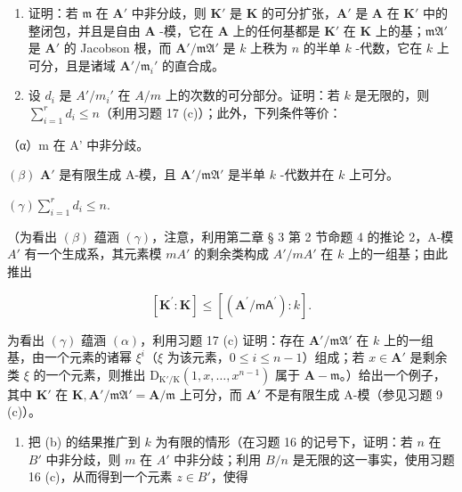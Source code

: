\begin{enumerate}
\def\labelenumi{(\alph{enumi})}
\item
  证明：若 \(\mathfrak{m}\) 在 \(\mathbf{A}'\) 中非分歧，则 \(\mathbf{K}'\) 是 \(\mathbf{K}\) 的可分扩张，\(\mathbf{A}'\) 是 \(\mathbf{A}\) 在 \(\mathbf{K}'\) 中的整闭包，并且是自由 \(\mathbf{A}\) -模，它在 \(\mathbf{A}\) 上的任何基都是 \(\mathbf{K}'\) 在 \(\mathbf{K}\) 上的基；\(\mathfrak{mA}'\) 是 \(\mathbf{A}'\) 的 Jacobson 根，而 \(\mathbf{A}' / \mathfrak{mA}'\) 是 \(k\) 上秩为 \(n\) 的半单 \(k\) -代数，它在 \(k\) 上可分，且是诸域 \(\mathbf{A}' / \mathfrak{m}_i'\) 的直合成。
\item
  设 \(d_{i}\) 是 \(A'/m_{i}'\) 在 \(A/m\) 上的次数的可分部分。证明：若 \(k\) 是无限的，则 \(\sum_{i=1}^{r} d_{i} \leqslant n\)（利用习题 17 (c)）；此外，下列条件等价：
\end{enumerate}

（α）m 在 A' 中非分歧。

\((\beta)\) \(\mathbf{A}'\) 是有限生成 A-模，且 \(\mathbf{A}' / \mathfrak{mA}'\) 是半单 \(k\) -代数并在 \(k\) 上可分。

\((\gamma)\sum_{i=1}^{r}d_{i}\leqslant n.\)

（为看出 \((\beta)\) 蕴涵 \((\gamma)\)，注意，利用第二章 § 3 第 2 节命题 4 的推论 2，A-模 \(A'\) 有一个生成系，其元素模 \(mA'\) 的剩余类构成 \(A'/mA'\) 在 \(k\) 上的一组基；由此推出

\[
[ \mathbf {K} ^ {\prime}: \mathbf {K} ] \leqslant [ (\mathbf {A} ^ {\prime} / \mathsf {m A} ^ {\prime}): k ].
\]

为看出 \((\gamma)\) 蕴涵 \((\alpha)\)，利用习题 17 (c) 证明：存在 \(\mathbf{A}' / \mathfrak{mA}'\) 在 \(k\) 上的一组基，由一个元素的诸幂 \(\xi^i\)（\(\xi\) 为该元素，\(0 \leqslant i \leqslant n - 1\)）组成；若 \(x \in \mathbf{A}'\) 是剩余类 \(\xi\) 的一个元素，则推出 \(\mathrm{D}_{\mathrm{K}' / \mathrm{K}}(1, x, \ldots, x^{n-1})\) 属于 \(\mathbf{A} - \mathfrak{m}\)。）给出一个例子，其中 \(\mathbf{K}'\) 在 \(\mathbf{K}, \mathbf{A}' / \mathfrak{mA}' = \mathbf{A} / \mathfrak{m}\) 上可分，而 \(\mathbf{A}'\) 不是有限生成 A-模（参见习题 9 (c)）。

\begin{enumerate}
\def\labelenumi{(\alph{enumi})}
\setcounter{enumi}{2}
\tightlist
\item
  把 (b) 的结果推广到 \(k\) 为有限的情形（在习题 16 的记号下，证明：若 \(n\) 在 \(B'\) 中非分歧，则 \(m\) 在 \(A'\) 中非分歧；利用 \(B / n\) 是无限的这一事实，使用习题 16 (c)，从而得到一个元素 \(z \in B'\)，使得
\end{enumerate}

